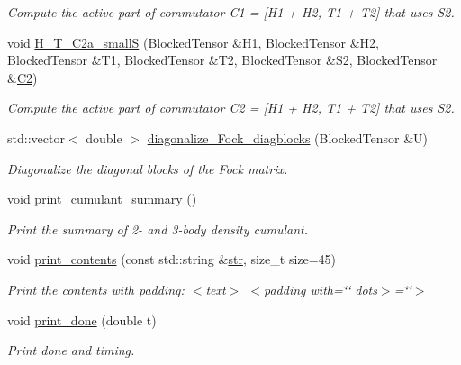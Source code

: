 \begin{DoxyCompactItemize}
\begin{DoxyCompactList}\small\item\em Compute the active part of commutator C1 = \mbox{[}H1 + H2, T1 + T2\mbox{]} that uses S2. \end{DoxyCompactList}\item 
void \mbox{\hyperlink{classforte_1_1_s_a_d_s_r_g_aafcfed4ad03eab60fdf4e366a2ffcd73}{H\+\_\+\+T\+\_\+\+C2a\+\_\+smallS}} (Blocked\+Tensor \&H1, Blocked\+Tensor \&H2, Blocked\+Tensor \&T1, Blocked\+Tensor \&T2, Blocked\+Tensor \&S2, Blocked\+Tensor \&\mbox{\hyperlink{namespaceforte_abe00ec86d0015c0f2b6ac298c6e428e4af1a543f5a2c5d49bc5dde298fcf716e4}{C2}})
\begin{DoxyCompactList}\small\item\em Compute the active part of commutator C2 = \mbox{[}H1 + H2, T1 + T2\mbox{]} that uses S2. \end{DoxyCompactList}\item 
std\+::vector$<$ double $>$ \mbox{\hyperlink{classforte_1_1_s_a_d_s_r_g_aa659267605a6bf5fded374a99fefb28f}{diagonalize\+\_\+\+Fock\+\_\+diagblocks}} (Blocked\+Tensor \&U)
\begin{DoxyCompactList}\small\item\em Diagonalize the diagonal blocks of the Fock matrix. \end{DoxyCompactList}\item 
void \mbox{\hyperlink{classforte_1_1_s_a_d_s_r_g_a43f5b7bb1f4be88e2ee64c9a640dc052}{print\+\_\+cumulant\+\_\+summary}} ()
\begin{DoxyCompactList}\small\item\em Print the summary of 2-\/ and 3-\/body density cumulant. \end{DoxyCompactList}\item 
void \mbox{\hyperlink{classforte_1_1_s_a_d_s_r_g_a27c5877a1eb1ac7d0e0593781863390f}{print\+\_\+contents}} (const std\+::string \&\mbox{\hyperlink{namespaceforte_af0f9481a38ad3ccb1dd258bdfea20492}{str}}, size\+\_\+t size=45)
\begin{DoxyCompactList}\small\item\em Print the contents with padding\+: $<$text$>$ $<$padding with=\char`\"{}\char`\"{} dots$>$=\char`\"{}\char`\"{}$>$ \end{DoxyCompactList}\item 
void \mbox{\hyperlink{classforte_1_1_s_a_d_s_r_g_a8daf7a2b45412f746b1fceeba6a0091c}{print\+\_\+done}} (double t)
\begin{DoxyCompactList}\small\item\em Print done and timing. \end{DoxyCompactList}\item 

\end{DoxyCompactItemize}
